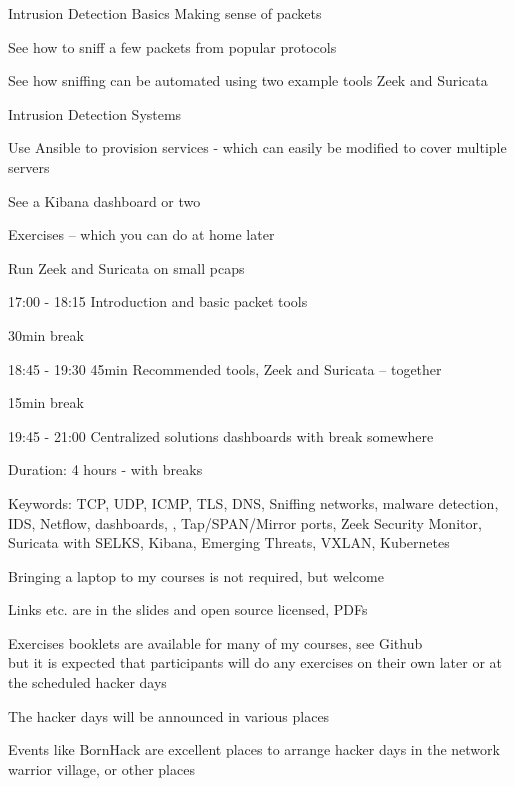 \documentclass[Screen16to9,17pt]{foils}
\begin{document}
\mytitlepage
{Intrusion Detection Basics}
{Making sense of packets}

\hlkprofiluk




\begin{list1}
\item See how to sniff a few packets from popular protocols
\item See how sniffing can be automated using two example tools Zeek and Suricata
\item Intrusion Detection Systems
\item Use Ansible to provision services - which can easily be modified to cover multiple servers
\item See a Kibana dashboard or two
\item Exercises -- which you can do at home later
\begin{list2}
\item Run Zeek and Suricata on small pcaps
\end{list2}
\end{list1}


\begin{list2}
\item 17:00 - 18:15 Introduction and basic packet tools
\item 30min break
\item 18:45 - 19:30 45min Recommended tools, Zeek and Suricata -- together
\item  15min break
\item 19:45 - 21:00 Centralized solutions dashboards with break somewhere
\end{list2}


Duration: 4 hours - with breaks

Keywords:
TCP, UDP, ICMP, TLS, DNS, Sniffing networks, malware detection, IDS, Netflow, dashboards, , Tap/SPAN/Mirror ports, Zeek Security Monitor, Suricata with SELKS, Kibana, Emerging Threats, VXLAN, Kubernetes




\begin{list2}
\item Bringing a laptop to my courses is not required, but welcome
\item Links etc. are in the slides and open source licensed, PDFs
\item Exercises booklets are available for many of my courses, see Github\\
but it is expected that participants will do any exercises on their own later or at the scheduled hacker days
\item The hacker days will be announced in various places

\item Events like BornHack are excellent places to arrange hacker days in the network warrior village, or other places
\end{list2}
\end{document}
